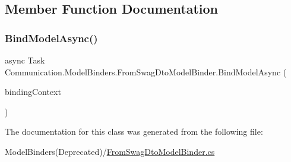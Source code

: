 \subsection{Member Function Documentation}
\mbox{\label{class_communication_1_1_model_binders_1_1_from_swag_dto_model_binder_a9f06cf186abe70ff88cf3895a5d83719}} 
\subsubsection{\texorpdfstring{Bind\+Model\+Async()}{BindModelAsync()}}
{\footnotesize\ttfamily async Task Communication.\+Model\+Binders.\+From\+Swag\+Dto\+Model\+Binder.\+Bind\+Model\+Async (\begin{DoxyParamCaption}\item[{Model\+Binding\+Context}]{binding\+Context }\end{DoxyParamCaption})}



The documentation for this class was generated from the following file\+:\begin{DoxyCompactItemize}
\item 
Model\+Binders(\+Deprecated)/\mbox{\hyperlink{_from_swag_dto_model_binder_8cs}{From\+Swag\+Dto\+Model\+Binder.\+cs}}\end{DoxyCompactItemize}
